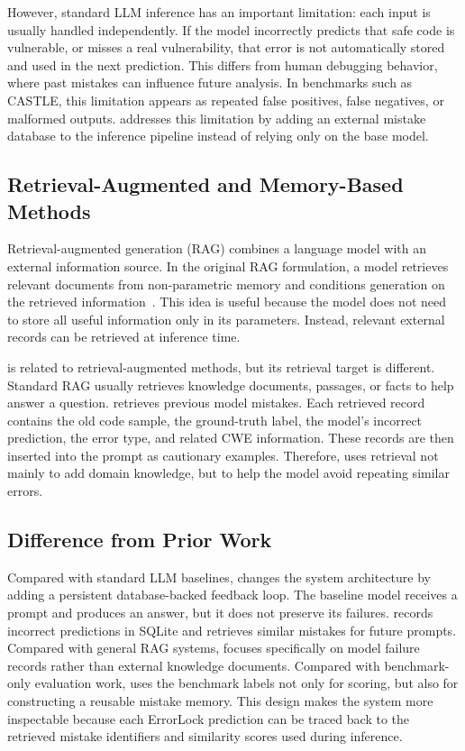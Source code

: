 However, standard LLM inference has an important limitation: each input is usually handled independently. If the model incorrectly predicts that safe code is vulnerable, or misses a real vulnerability, that error is not automatically stored and used in the next prediction. This differs from human debugging behavior, where past mistakes can influence future analysis. In benchmarks such as CASTLE, this limitation appears as repeated false positives, false negatives, or malformed outputs. \system addresses this limitation by adding an external mistake database to the inference pipeline instead of relying only on the base model.

\subsection{Retrieval-Augmented and Memory-Based Methods}

Retrieval-augmented generation (RAG) combines a language model with an external information source. In the original RAG formulation, a model retrieves relevant documents from non-parametric memory and conditions generation on the retrieved information~\cite{rag}. This idea is useful because the model does not need to store all useful information only in its parameters. Instead, relevant external records can be retrieved at inference time.

\system is related to retrieval-augmented methods, but its retrieval target is different. Standard RAG usually retrieves knowledge documents, passages, or facts to help answer a question. \system retrieves previous model mistakes. Each retrieved record contains the old code sample, the ground-truth label, the model's incorrect prediction, the error type, and related CWE information. These records are then inserted into the prompt as cautionary examples. Therefore, \system uses retrieval not mainly to add domain knowledge, but to help the model avoid repeating similar errors.

\subsection{Difference from Prior Work}

Compared with standard LLM baselines, \system changes the system architecture by adding a persistent database-backed feedback loop. The baseline model receives a prompt and produces an answer, but it does not preserve its failures. \system records incorrect predictions in SQLite and retrieves similar mistakes for future prompts. Compared with general RAG systems, \system focuses specifically on model failure records rather than external knowledge documents. Compared with benchmark-only evaluation work, \system uses the benchmark labels not only for scoring, but also for constructing a reusable mistake memory. This design makes the system more inspectable because each ErrorLock prediction can be traced back to the retrieved mistake identifiers and similarity scores used during inference.